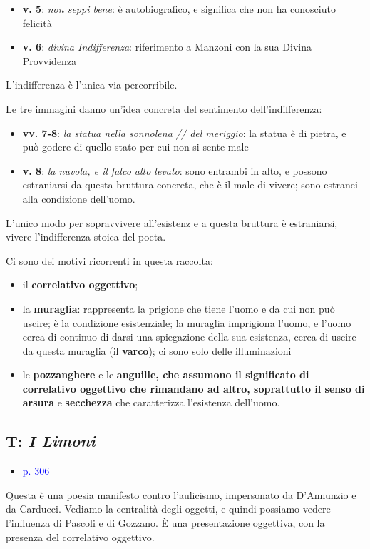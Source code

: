 \documentclass[a4paper, twoside, titlepage]{book}
\newcommand{\elenco}[1]{%
\begin{itemize}
#1
\end{itemize}}
\renewcommand{\emph}[1]{\textcolor{blue}{#1}}
\begin{document}
\elenco{\item \textbf{v. 5}: \textit{non seppi bene}: è autobiografico, e significa che non ha conosciuto felicità\item \textbf{v. 6}: \textit{divina Indifferenza}: riferimento a Manzoni con la sua Divina Provvidenza}

L'indifferenza è l'unica via percorribile.

Le tre immagini danno un'idea concreta del sentimento dell'indifferenza:
\elenco{\item \textbf{vv. 7-8}: \textit{la statua nella sonnolena // del meriggio}: la statua è di pietra, e può godere di quello stato per cui non si sente male\item \textbf{v. 8}: \textit{la nuvola, e il falco alto levato}: sono entrambi in alto, e possono estraniarsi da questa bruttura concreta, che è il male di vivere; sono estranei alla condizione dell'uomo.}

L'unico modo per sopravvivere all'esistenz e a questa bruttura è estraniarsi, vivere l'indifferenza stoica del poeta.

\vspace{1em}

Ci sono dei motivi ricorrenti in questa raccolta: 
\elenco{\item il \textbf{correlativo oggettivo};\item la \textbf{muraglia}: rappresenta la prigione che tiene l'uomo e da cui non può uscire; è la condizione esistenziale; la muraglia imprigiona l'uomo, e l'uomo cerca di continuo di darsi una spiegazione della sua esistenza, cerca di uscire da questa muraglia (il \textbf{varco}); ci sono solo delle illuminazioni\item le \textbf{pozzanghere} e le \textbf{anguille\textbf{, che assumono il significato di correlativo oggettivo che rimandano ad altro, soprattutto il senso di }arsura} e \textbf{secchezza} che caratterizza l'esistenza dell'uomo.}

\subsection{T: \textit{I Limoni}}

\elenco{\item \emph{p. 306}}

Questa è una poesia manifesto contro l'aulicismo, impersonato da D'Annunzio e da Carducci. Vediamo la centralità degli oggetti, e quindi possiamo vedere l'influenza di Pascoli e di Gozzano.
È una presentazione oggettiva, con la presenza del correlativo oggettivo.
\end{document}
